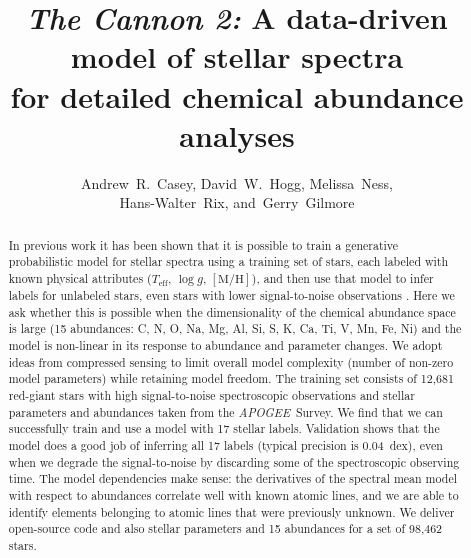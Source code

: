 \documentclass[12pt,preprint]{aastex}
\newcommand{\project}[1]{\textsl{#1}}
\newcommand{\acronym}[1]{{\small{#1}}}
\newcommand{\apogee}{\project{\acronym{APOGEE}}}
\newcommand{\logg}{\log g}
\newcommand{\mh}{\mathrm{[M/H]}}
\newcommand{\Teff}{T_{\mathrm{eff}}}
\begin{document}
\title{\textsl{The Cannon 2:} A data-driven model of stellar spectra \\
       for detailed chemical abundance analyses}
\author{Andrew~R.~Casey,
        David~W.~Hogg,
        Melissa~Ness,\\
        Hans-Walter~Rix,
    and~Gerry~Gilmore}


\begin{abstract}
In previous work it has been shown that it is possible to train a generative
probabilistic model for stellar spectra using a training set of stars, each 
labeled with known physical attributes ($\Teff$, $\logg$, $\mh$), and then use 
that model to infer labels for unlabeled stars, even stars with lower 
signal-to-noise observations \citep{tc}.
Here we ask whether this is possible when the dimensionality of the chemical
abundance space is large (15 abundances: C, N, O, Na, Mg, Al, Si, S, K, Ca, Ti, 
V, Mn, Fe, Ni) and the model is non-linear in its response to abundance and 
parameter changes.
We adopt ideas from compressed sensing to limit overall model complexity (number
of non-zero model parameters) while retaining model freedom.  The training set 
consists of 12,681 red-giant stars with high signal-to-noise spectroscopic 
observations and stellar parameters and abundances taken from the \apogee\ 
Survey.
We find that we can successfully train and use a model with 17 stellar labels.
Validation shows that the model does a good job of inferring all 17 labels (typical precision is 0.04~dex), even
when we degrade the signal-to-noise by discarding some of
the spectroscopic observing time.  The model dependencies make sense: the 
derivatives of the spectral mean model with respect to abundances correlate well
with known atomic lines, and we are able to identify elements belonging to 
atomic lines that were previously unknown.  We deliver open-source code and also
stellar parameters and 15 abundances for a set of 98,462 stars.
\end{abstract}
\end{document}
